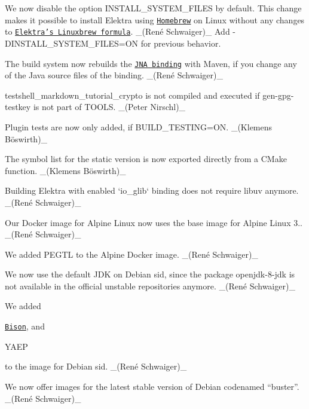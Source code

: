 \begin{DoxyItemize}
\item We now disable the option {\ttfamily I\+N\+S\+T\+A\+L\+L\+\_\+\+S\+Y\+S\+T\+E\+M\+\_\+\+F\+I\+L\+ES} by default. This change makes it possible to install Elektra using \href{https://brew.sh}{\tt Homebrew} on Linux without any changes to \href{https://github.com/Homebrew/linuxbrew-core/blob/master/Formula/elektra.rb}{\tt Elektra’s Linuxbrew formula}. \+\_\+(René Schwaiger)\+\_\+ Add {\ttfamily -\/\+D\+I\+N\+S\+T\+A\+L\+L\+\_\+\+S\+Y\+S\+T\+E\+M\+\_\+\+F\+I\+L\+ES=ON} for previous behavior.
\item The build system now rebuilds the \href{https://www.libelektra.org/bindings/jna}{\tt J\+NA binding} with Maven, if you change any of the Java source files of the binding. \+\_\+(René Schwaiger)\+\_\+
\item {\ttfamily testshell\+\_\+markdown\+\_\+tutorial\+\_\+crypto} is not compiled and executed if {\ttfamily gen-\/gpg-\/testkey} is not part of T\+O\+O\+LS. \+\_\+(\+Peter Nirschl)\+\_\+
\item Plugin tests are now only added, if {\ttfamily B\+U\+I\+L\+D\+\_\+\+T\+E\+S\+T\+I\+NG=ON}. \+\_\+(Klemens Böswirth)\+\_\+
\item The symbol list for the static version is now exported directly from a C\+Make function. \+\_\+(Klemens Böswirth)\+\_\+
\item Building Elektra with enabled `io\+\_\+glib` binding does not require libuv anymore. \+\_\+(René Schwaiger)\+\_\+
\end{DoxyItemize}


\begin{DoxyItemize}
\item Our Docker image for Alpine Linux now uses the base image for Alpine Linux 3.. \+\_\+(René Schwaiger)\+\_\+
\item We added P\+E\+G\+TL to the Alpine Docker image. \+\_\+(René Schwaiger)\+\_\+
\end{DoxyItemize}


\begin{DoxyItemize}
\item We now use the default J\+DK on Debian sid, since the package {\ttfamily openjdk-\/8-\/jdk} is not available in the official unstable repositories anymore. \+\_\+(René Schwaiger)\+\_\+
\item We added
\begin{DoxyItemize}
\item \href{https://www.gnu.org/software/bison/}{\tt Bison}, and
\item Y\+A\+EP
\end{DoxyItemize}

to the image for Debian sid. \+\_\+(René Schwaiger)\+\_\+
\item We now offer images for the latest stable version of Debian codenamed “buster”. \+\_\+(René Schwaiger)\+\_\+
\end{DoxyItemize}


